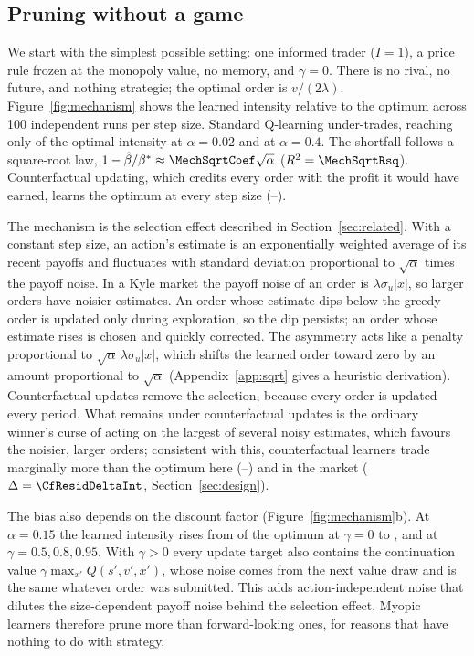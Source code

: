 \subsection{Pruning without a game}
\label{sec:mechanism}

We start with the simplest possible setting: one informed trader ($I=1$), a
price rule frozen at the monopoly value, no memory, and $\gamma=0$. There is no
rival, no future, and nothing strategic; the optimal order is $v/(2\lambda)$.
Figure~\ref{fig:mechanism} shows the learned intensity relative to the optimum
across 100 independent runs per step size. Standard Q-learning under-trades,
reaching only \MechTakenA{} of the optimal intensity at $\alpha=0.02$ and
\MechTakenE{} at $\alpha=0.4$. The shortfall follows a square-root law,
$1-\hat\beta/\beta^\ast\approx\MechSqrtCoef\sqrt\alpha$ ($R^2=\MechSqrtRsq$).
Counterfactual updating, which credits every order with the profit it would
have earned, learns the optimum at every step size
(\MechCfA--\MechCfE).

The mechanism is the selection effect described in Section~\ref{sec:related}.
With a constant step size, an action's estimate is an exponentially weighted
average of its recent payoffs and fluctuates with standard deviation
proportional to $\sqrt{\alpha}$ times the payoff noise. In a Kyle market the
payoff noise of an order is $\lambda\sigma_u|x|$, so larger orders have noisier
estimates. An order whose estimate dips below the greedy order is updated only
during exploration, so the dip persists; an order whose estimate rises is
chosen and quickly corrected. The asymmetry acts like a penalty proportional
to $\sqrt\alpha\,\lambda\sigma_u|x|$, which shifts the learned order toward
zero by an amount proportional to $\sqrt\alpha$ (Appendix~\ref{app:sqrt}
gives a heuristic derivation). Counterfactual updates remove
the selection, because every order is updated every period. What remains
under counterfactual updates is the ordinary winner's curse of acting on the
largest of several noisy estimates, which favours the noisier, larger
orders; consistent with this, counterfactual learners trade marginally more
than the optimum here (\MechCfA--\MechCfE) and in the market
($\Delta=\CfResidDeltaInt$, Section~\ref{sec:design}).

The bias also depends on the discount factor (Figure~\ref{fig:mechanism}b).
At $\alpha=0.15$ the learned intensity rises from \MechGammaA{} of the optimum
at $\gamma=0$ to \MechGammaB{}, \MechGammaC{} and \MechGammaD{} at
$\gamma=0.5,0.8,0.95$. With $\gamma>0$ every update target also contains the
continuation value $\gamma\max_{x'}Q(s',v',x')$, whose noise comes from the next
value draw and is the same whatever order was submitted. This adds
action-independent noise that dilutes the size-dependent payoff noise behind the
selection effect. Myopic learners therefore prune more than forward-looking ones,
for reasons that have nothing to do with strategy.

